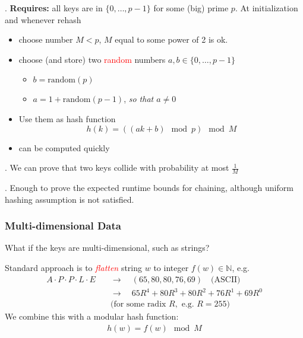 \documentclass{article}
\begin{document}
\begin{algo}[].
    \textbf{Requires:} all keys are in $\{0, \dots, p - 1\}$ for some (big) prime $p$. At initialization and whenever rehash
    \begin{itemize}
        \item choose number $M < p$, $M$ equal to some power of 2 is ok. 
        \item choose (and store) two \textcolor{red}{random} numbers $a, b \in \{0, \dots, p - 1\}$
        \begin{itemize}
            \item $b = \text{random}(p)$
            \item $a = 1 + \text{random}(p - 1)$, \textit{so that $a \neq 0$}
        \end{itemize}
        \item Use them as hash function
        \[ h(k) = ((ak + b) \mod p) \mod M \]
        \item can be computed quickly
    \end{itemize}
\end{algo}

\begin{thmm}[].
    We can prove that two keys collide with probability at most $\frac{1}{M}$
    \begin{comm}[].
        Enough to prove the expected runtime bounds for chaining, although uniform hashing assumption is not satisfied. 
    \end{comm}
\end{thmm}

\subsubsection{Multi-dimensional Data}

\begin{Question}{}
    What if the keys are multi-dimensional, such as strings? 
\end{Question}

\begin{solution}
    Standard approach is to \textcolor{red}{\textit{flatten}} string $w$ to integer $f(w) \in \mathbb{N}$, e.g.
    \begin{align*}
        \mathit{A \cdot P \cdot P \cdot L \cdot E} &\quad \rightarrow \quad (65, 80, 80, 76, 69) \quad \text{(ASCII)} \\
        &\quad \rightarrow \quad 65R^4 + 80R^3 + 80R^2 + 76R^1 + 69R^0 \\
        &\quad \text{(for some radix } R, \text{ e.g. } R = 255)
    \end{align*}
    We combine this with a modular hash function:
    \begin{align*}
        \boxed{ h(w) = f(w) \mod M }
    \end{align*}
\end{solution}
\end{document}
